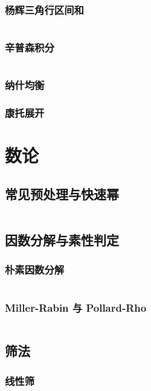 \documentclass[a4paper, twoside]{article}
\begin{document}
\begin{multicols}{2}
				\subsubsection{杨辉三角行区间和}
					\inputminted{cpp}{../src-midori/math/杨辉三角行区间和.cpp}
				\subsubsection{辛普森积分}
					\inputminted{cpp}{../src-midori/math/simpson.cpp}
				\subsubsection{纳什均衡}
					
				\subsubsection{康托展开}
					

		\newpage
		\section{数论}

			\subsection{常见预处理与快速幂}
				\inputminted{cpp}{../src-midori/number/常见预处理与快速幂.cpp}

			\subsection{因数分解与素性判定}
				\subsubsection{朴素因数分解}
					\inputminted{cpp}{../src-midori/number/素因数分解.cpp}
				\subsubsection{Miller-Rabin 与 Pollard-Rho}
					\inputminted{cpp}{../src-midori/number/miller_rabin-pollard_rho.cpp}

			\subsection{筛法}
				\subsubsection{线性筛}
					\inputminted{cpp}{../src-midori/number/线性筛.cpp}

\end{multicols}
\end{document}
